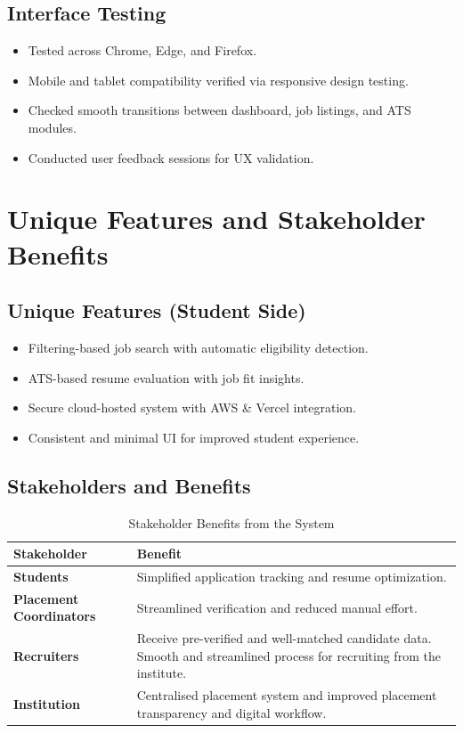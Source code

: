 \documentclass[14pt]{extarticle}
\begin{document}
\subsection{Interface Testing}
\begin{itemize}
  \item Tested across Chrome, Edge, and Firefox.
  \item Mobile and tablet compatibility verified via responsive design testing.
  \item Checked smooth transitions between dashboard, job listings, and ATS modules.
  \item Conducted user feedback sessions for UX validation.
\end{itemize}

\section{Unique Features and Stakeholder Benefits}

\subsection{Unique Features (Student Side)}
\begin{itemize}
  \item Filtering-based job search with automatic eligibility detection.
  \item ATS-based resume evaluation with job fit insights.
  \item Secure cloud-hosted system with AWS \& Vercel integration.
  \item Consistent and minimal UI for improved student experience.
\end{itemize}

\subsection{Stakeholders and Benefits}
\begin{table}[H]
\centering
\begin{tabular}{|p{4cm}|p{10cm}|}
\hline
\textbf{Stakeholder} & \textbf{Benefit} \\ \hline
\textbf{Students} & Simplified application tracking and resume optimization. \\ \hline
\textbf{Placement Coordinators} & Streamlined verification and reduced manual effort. \\ \hline
\textbf{Recruiters} & Receive pre-verified and well-matched candidate data. Smooth and streamlined process for recruiting from the institute. \\ \hline
\textbf{Institution} & Centralised placement system and improved placement transparency and digital workflow. \\ \hline
\end{tabular}
\caption{Stakeholder Benefits from the System}
\end{table}
\end{document}

